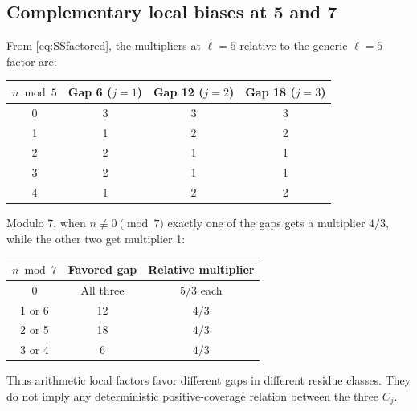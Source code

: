 \documentclass[11pt,a4paper]{article}
\theoremstyle{definition}
\begin{document}
\subsection{Complementary local biases at 5 and 7}
From \eqref{eq:SSfactored}, the multipliers at $\ell=5$ relative to the generic $\ell=5$ factor are:
\begin{center}
\begin{tabular}{c c c c}
\toprule
$n\bmod5$ & Gap 6 ($j=1$) & Gap 12 ($j=2$) & Gap 18 ($j=3$)\\
\midrule
0&3&3&3\\
1&1&2&2\\
2&2&1&1\\
3&2&1&1\\
4&1&2&2\\
\bottomrule
\end{tabular}
\end{center}
Modulo 7, when $n\not\equiv0\pmod7$ exactly one of the gaps gets a multiplier $4/3$, while the other two get multiplier 1:
\begin{center}
\begin{tabular}{c c c}
\toprule
$n\bmod7$ & Favored gap & Relative multiplier\\
\midrule
0&All three&$5/3$ each\\
1 or 6&12&$4/3$\\
2 or 5&18&$4/3$\\
3 or 4&6&$4/3$\\
\bottomrule
\end{tabular}
\end{center}
Thus arithmetic local factors favor different gaps in different residue classes. They do not imply any deterministic positive-coverage relation between the three $C_j$.
\end{document}
